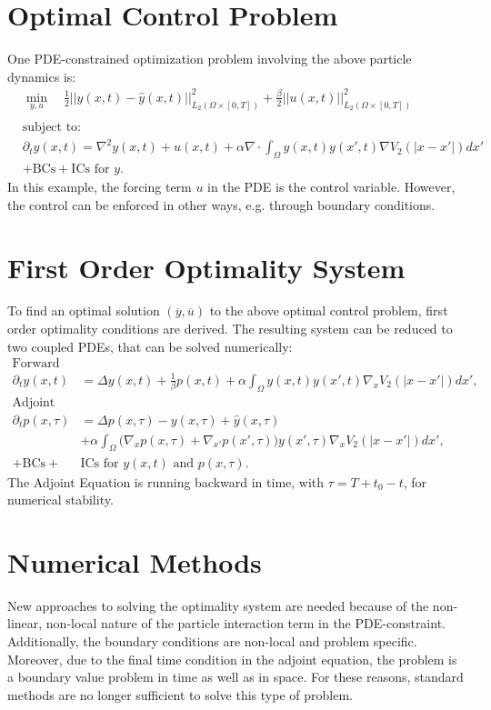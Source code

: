 \documentclass[a0,portrait]{a0poster}
\newcommand{\Sta}{y}
\newcommand{\Adj}{p}
\newcommand{\Con}{u}
\begin{document}
\begin{multicols}{2}
\section*{Optimal Control Problem}
One PDE-constrained optimization problem involving the above particle dynamics is:
\begin{align*}
&\min_{\Sta,u} \quad \frac{1}{2}||{\Sta(x,t)- \hat{\Sta}(x,t)}||_{L_2(\Omega \times [0,T])}^2 + \frac{\beta}{2} ||{\Con}(x,t)||_{L_2(\Omega \times [0,T])}^2\\
\\
&\text{subject to:}
\\
&\partial_t \Sta(x,t) =\nabla^2 \Sta(x,t) +\Con(x,t) + \alpha \nabla \cdot\int_\Omega \Sta(x,t) \Sta(x',t) \nabla V_2(|x-x'|)dx' \\
&+\text{BCs} + \text{ICs for } \Sta.
\end{align*}
 In this example, the forcing term $\Con$ in the PDE is the control variable. However, the control can be enforced in other ways, e.g. through boundary conditions.
\section*{First Order Optimality System}
To find an optimal solution $(\overline{\Sta},\overline{u})$ to the above optimal control problem, first order optimality conditions are derived. The resulting system can be reduced to two coupled PDEs, that can be solved numerically: 
\begin{align*}
\text{Forward Problem}\\
\partial_t \Sta(x,t) &= \Delta \Sta(x,t) + \frac{1}{\beta}\Adj(x,t) +\alpha\int_\Omega\Sta(x,t) \Sta(x',t) \nabla_x V_2(|x-x'|)dx',\\
\text{Adjoint Equation}\\
\partial_t \Adj(x,\tau) &=  \Delta \Adj(x,\tau) -\Sta(x,\tau) +\hat{\Sta}(x,\tau) \\
&+\alpha\int_\Omega \bigg( \nabla_x \Adj(x,\tau) + \nabla_{x'} \Adj(x',\tau) \bigg) \Sta(x',\tau) \nabla_x V_2(|x-x'|)dx',\\
+\text{BCs} + &\text{ICs for } \Sta(x,t) \text{ and } \Adj(x,\tau).
\end{align*}
The Adjoint Equation is running backward in time, with $\tau = T+t_0 -t$, for numerical stability.
\section*{Numerical Methods}
New approaches to solving the optimality system are needed because of the non-linear, non-local nature of the particle interaction term in the PDE-constraint. Additionally, the boundary conditions are non-local and problem specific. Moreover, due to the final time condition in the adjoint equation, the problem is a boundary value problem in time as well as in space. For these reasons, standard methods are no longer sufficient to solve this type of problem.  	


\end{multicols}
\end{document}
